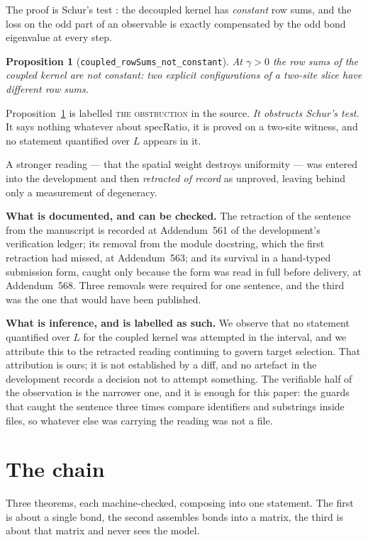 \documentclass[11pt]{article}
\newtheorem{proposition}[theorem]{Proposition}
\theoremstyle{definition}
\newcommand{\specRatio}{\mathrm{specRatio}}
\begin{document}
The proof is Schur's test \cite{Schur1911}: the decoupled kernel has \emph{constant} row sums, and
the loss on the odd part of an observable is exactly compensated by the odd bond
eigenvalue at every step.

\begin{proposition}[\texttt{coupled\_rowSums\_not\_constant}]
\label{prop:obstruction}
At $\gamma>0$ the row sums of the coupled kernel are not constant: two explicit
configurations of a two-site slice have different row sums.
\end{proposition}

Proposition~\ref{prop:obstruction} is labelled \textsc{the obstruction} in the
source.  \emph{It obstructs Schur's test.}  It says nothing whatever about
$\specRatio$, it is proved on a two-site witness, and no statement quantified
over $L$ appears in it.

A stronger reading --- that the spatial weight destroys uniformity --- was
entered into the development and then \emph{retracted of record} as unproved,
leaving behind only a measurement of degeneracy.

\textbf{What is documented, and can be checked.}  The retraction of the sentence
from the manuscript is recorded at Addendum~561 of the development's
verification ledger; its removal from the module docstring, which the first
retraction had missed, at Addendum~563; and its survival in a hand-typed
submission form, caught only because the form was read in full before delivery,
at Addendum~568.  Three removals were required for one sentence, and the third
was the one that would have been published.

\textbf{What is inference, and is labelled as such.}  We observe that no
statement quantified over $L$ for the coupled kernel was attempted in the
interval, and we attribute this to the retracted reading continuing to govern
target selection.  That attribution is ours; it is not established by a
diff, and no artefact in the development records a decision not to attempt
something.  The verifiable half of the observation is the narrower one, and it
is enough for this paper: the guards that caught the sentence three times
compare identifiers and substrings inside files, so whatever else was carrying
the reading was not a file.

\section{The chain}

Three theorems, each machine-checked, composing into one statement.  The first
is about a single bond, the second assembles bonds into a matrix, the third is
about that matrix and never sees the model.
\end{document}
